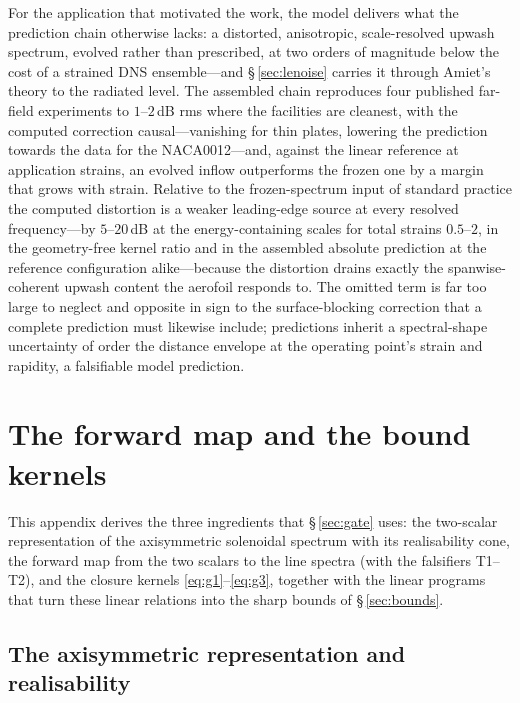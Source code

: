 \documentclass[lineno]{JFM-FLM_Au}
\begin{document}
For the application that motivated the work, the model delivers what
the prediction chain otherwise lacks: a distorted, anisotropic, scale-resolved
upwash spectrum, evolved rather than prescribed, at two orders of
magnitude below the cost of a strained DNS ensemble---and
\S\,\ref{sec:lenoise} carries it through Amiet's theory to the
radiated level. The assembled chain reproduces four published far-field experiments to
$1$--$2$\,dB rms where the facilities are cleanest, with the computed
correction causal---vanishing for thin plates, lowering the
prediction towards the data for the NACA0012---and, against the linear
reference at application strains, an evolved inflow outperforms the frozen
one by a margin that grows with strain. Relative to the
frozen-spectrum input of standard practice the computed distortion is
a weaker leading-edge source at every resolved frequency---by
$5$--$20$\,dB at the energy-containing scales for total strains
$0.5$--$2$, in the geometry-free kernel ratio and in the assembled
absolute prediction at the reference configuration alike---because the
distortion drains exactly the spanwise-coherent upwash content the
aerofoil responds to. The omitted
term is far too large to neglect and opposite in sign to the
surface-blocking correction that a complete prediction must
likewise include; predictions inherit a spectral-shape uncertainty of order
the distance envelope at the operating point's strain and rapidity,
a falsifiable model prediction.

\appendix
\section{The forward map and the bound kernels}\label{app:forward}

This appendix derives the three ingredients that \S\,\ref{sec:gate} uses:
the two-scalar representation of the axisymmetric solenoidal spectrum with
its realisability cone, the forward map from the two scalars to the line
spectra (with the falsifiers T1--T2), and the closure kernels
\eqref{eq:g1}--\eqref{eq:g3}, together with the linear programs that turn
these linear relations into the sharp bounds of \S\,\ref{sec:bounds}.

\subsection{The axisymmetric representation and realisability}
\label{app:twoscalar}
\end{document}
